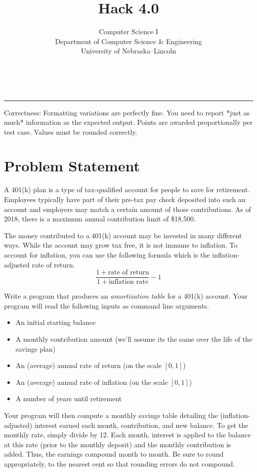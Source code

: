 \documentclass[12pt]{scrartcl}
\title{Hack 4.0}\let\Title\@title
\subtitle{Computer Science I\\
{\small
\vskip1cm
Department of Computer Science \& Engineering \\
University of Nebraska--Lincoln}
\vskip-1cm}
\date{~}
\begin{document}
\maketitle

\hrule



Correctness: Formatting variations are perfectly fine.  You need to
report *just as much* information as the expected output.
Points are awarded proportionally per test case.  Values must be
rounded correctly.

\section*{Problem Statement}

A 401(k) plan is a type of tax-qualified account for people to save 
for retirement.  Employees typically have part of their pre-tax pay
check deposited into such an account and employers may match a certain
amount of those contributions.  As of 2018, there is a maximum
annual contribution limit of \$18,500.
 
The money contributed to a 401(k) account may be invested in many
different ways.  While the account may grow tax free, it is not 
immune to inflation.  To account for inflation, you can use
the following formula which is the inflation-adjusted rate of
return.
  $$\frac{1 + \textrm{rate of return}}{1+\textrm{inflation rate}} - 1$$

Write a program that produces an \emph{amortization table} for a
401(k) account.  Your program will read the following inputs as 
command line arguments.
\begin{itemize}
  \item An initial starting balance
  \item A monthly contribution amount (we'll assume its the same over the life of the savings plan)
  \item An (average) annual rate of return (on the scale $[0, 1]$)
  \item An (average) annual rate of inflation (on the scale $[0, 1]$)
  \item A number of years until retirement
\end{itemize}
Your program will then compute a monthly savings table detailing
the (inflation-adjusted) interest earned each month, contribution, and
new balance.  To get the monthly rate, simply divide by 12.  Each month, 
interest is applied to the balance at this rate (prior to the monthly 
deposit) and the monthly contribution is added.  Thus, the earnings 
compound month to month.  Be sure to round appropriately, to the nearest
cent so that rounding errors do not compound.
\end{document}
